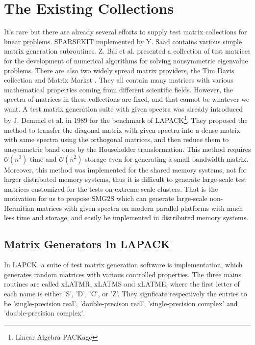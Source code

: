 \section{The Existing Collections} \label{Existing Collections}

It's rare but there are already several efforts to supply test matrix collections for linear problems. SPARSEKIT \cite{saad1994sparsekit} implemented by Y. Saad contains various simple matrix generation subroutines. Z. Bai et al. \cite{bai1996test} presented a collection of test matrices for the development of numerical algorithms for solving nonsymmetric eigenvalue problems. There are also two widely spread matrix providers, the Tim Davis collection \cite{davis2011university} and Matrix Market \cite{boisvert1997matrix}. They all contain many matrices with various mathematical properties coming from different scientific fields. However, the spectra of matrices in these collections are fixed, and that cannot be whatever we want. A test matrix generation suite with given spectra was already introduced by J. Demmel et al. \cite{demmel1989test} in 1989 for the benchmark of LAPACK\footnote{Linear Algebra PACKage}. They proposed the method to transfer the diagonal matrix with given spectra into a dense matrix with same spectra using the orthogonal matrices, and then reduce them to unsymmetric band ones by the Householder transformation. This method requires $\mathcal{O}(n^3)$ time and $\mathcal{O}(n^2)$ storage even for generating a small bandwidth matrix. Moreover, this method was implemented for the shared memory systems, not for larger distributed memory systems, thus it is difficult to generate large-scale test matrices customized for the tests on extreme scale clusters. That is the motivation for us to propose SMG2S which can generate large-scale non-Hermitian matrices with given spectra on modern parallel platforms with much less time and storage, and easily be implemented in distributed memory systems.

\subsection{Matrix Generators In LAPACK}

In LAPCK, a suite of test matrix generation software is implementation, which generates random matrices with various controlled properties. The three mains routines are called xLATMR, xLATMS and xLATME, where the first letter of each name is either 'S', 'D', 'C', or 'Z'. They signficate respectively the entries to be 'single-precision real', 'double-precison real', 'single-precision complex' and 'double-precision complex'.

